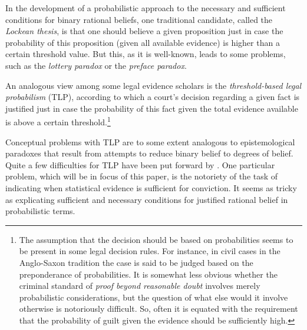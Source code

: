 \documentclass{article}
\begin{document}
In the development of a probabilistic approach to the necessary and sufficient conditions for binary rational beliefs, one traditional candidate, called the \emph{Lockean thesis}, is that one should believe a given proposition just in case the probability of this proposition (given all available evidence) is higher than a certain threshold value. But this, as it is well-known, leads to some problems, such as the \emph{lottery paradox} or the \emph{preface paradox}. 



An analogous view among some legal evidence scholars is the \emph{threshold-based legal probabilism} (TLP), according to which a court's decision regarding a given fact is justified just in case the probability of this fact given the total evidence available is above a certain threshold.\footnote{The assumption that the decision should be based on probabilities seems to be present in some legal decision rules. For instance, in civil cases in the Anglo-Saxon tradition the case is said to be judged based on the preponderance of probabilities. It is somewhat less obvious whether the criminal standard of \emph{proof beyond reasonable doubt} involves merely probabilistic considerations, but the question of what else would it involve otherwise is notoriously difficult.  So, often it is equated with the requirement that the probability of guilt given the evidence should be sufficiently high.}


Conceptual problems with  TLP  are to some extent analogous to  epistemological paradoxes that result from attempts to reduce binary belief to degrees of belief.  Quite a few difficulties for TLP have been put forward  by \citet{Cohen1977The-probable-an}. One particular problem, which will be in focus of this paper, is the notoriety of the task of 
indicating when statistical evidence is sufficient for conviction. It seems as tricky as explicating sufficient and necessary conditions for justified rational belief in probabilistic terms.
\end{document}
